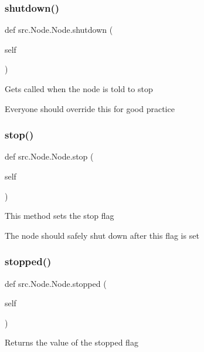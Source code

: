 \subsubsection{\texorpdfstring{shutdown()}{shutdown()}}
{\footnotesize\ttfamily def src.\+Node.\+Node.\+shutdown (\begin{DoxyParamCaption}\item[{}]{self }\end{DoxyParamCaption})}

\begin{DoxyVerb}Gets called when the node is told to stop

Everyone should override this for good practice
\end{DoxyVerb}
 \mbox{\label{classsrc_1_1_node_1_1_node_a57c5c681b709272de35533e1c02ef394}} 
\subsubsection{\texorpdfstring{stop()}{stop()}}
{\footnotesize\ttfamily def src.\+Node.\+Node.\+stop (\begin{DoxyParamCaption}\item[{}]{self }\end{DoxyParamCaption})}

\begin{DoxyVerb}This method sets the stop flag

The node should safely shut down after this flag is set
\end{DoxyVerb}
 \mbox{\label{classsrc_1_1_node_1_1_node_a802978364e02620c7c74515b21f14654}} 
\subsubsection{\texorpdfstring{stopped()}{stopped()}}
{\footnotesize\ttfamily def src.\+Node.\+Node.\+stopped (\begin{DoxyParamCaption}\item[{}]{self }\end{DoxyParamCaption})}

\begin{DoxyVerb}Returns the value of the stopped flag\end{DoxyVerb}
 \mbox{\label{classsrc_1_1_node_1_1_node_a8041d0079f6d0526756bc037a6c8a802}} 
